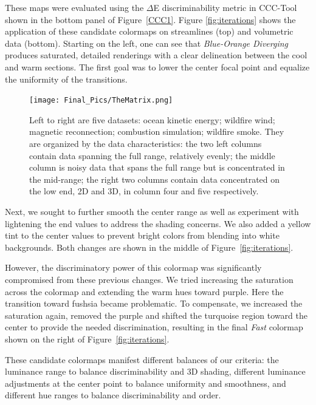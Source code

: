 \documentclass{IEEEcsmag}
\newcommand*{\colormap}[1]{\textsl{#1}\xspace}
\newcommand*{\coolwarm}{\colormap{Cool to Warm}}
\newcommand*{\blueorange}{\colormap{Blue-Orange Diverging}}
\newcommand*{\fast}{\colormap{Fast}}
\begin{document}
These maps were evaluated using the $\Delta$E discriminability metric in CCC-Tool shown in the bottom panel of Figure~\ref{CCC1}. Figure \ref{fig:iterations} shows the application of these candidate colormaps on streamlines (top) and volumetric data (bottom).
Starting on the left, one can see that \blueorange produces saturated, detailed renderings with a clear delineation between the cool and warm sections.
The first goal was to lower the center focal point and equalize the uniformity of the transitions.

\begin{figure}[t]
\centering
\texttt{[image: Final\_Pics/TheMatrix.png]}
\caption{Left to right are five datasets: ocean kinetic energy; wildfire wind; magnetic reconnection; combustion simulation; wildfire smoke. They are organized by the data characteristics: the two left columns contain data spanning the full range, relatively evenly; the middle column is noisy data that spans the full range but is concentrated in the mid-range; the right two columns contain data concentrated on the low end, 2D and 3D, in column four and five respectively. }
\label{fig:Matrix}
\end{figure}


Next, we sought to further smooth the center range as well as experiment with lightening the end values to address the shading concerns.
We also added a yellow tint to the center values to prevent bright colors from blending into white backgrounds.
Both changes are shown in the middle of Figure~\ref{fig:iterations}.


However, the discriminatory power of this colormap was significantly compromised from these previous changes. We tried increasing the saturation across the colormap and extending the warm hues toward purple. Here the transition toward fushsia became problematic. To compensate, we increased the saturation again, removed the purple and shifted the turquoise region toward the center to provide the needed discrimination, resulting in the final \fast colormap shown on the right of Figure~\ref{fig:iterations}.

These candidate colormaps manifest different balances of our criteria: the luminance range to balance discriminability and 3D shading, different luminance adjustments at the center point to balance uniformity and smoothness, and different hue ranges to balance discriminability and order.


\end{document}
